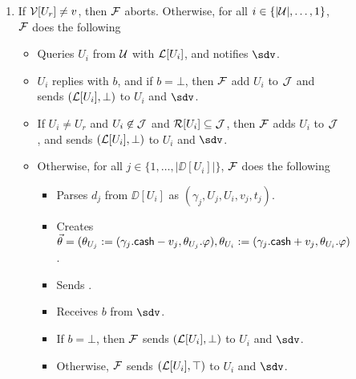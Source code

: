 \begin{figure*}[!t]
{{\begin{enumerate}
	\item If $\mathcal{V}[U_r] \neq v$, then $\mathcal{F}$ aborts. Otherwise, for all $i \in \{|\mathcal{U}|,\ldots,1\}$, 
	$\mathcal{F}$ does the following
	\begin{itemize}[label=-]
		\item Queries $U_i$ from $\mathcal{U}$ with $\mathcal{L}[U_i]$, and notifies $\sdv$.
		\item $U_i$ replies with $b$, and if $b = \bot$, then $\mathcal{F}$ add $U_i$ to $\mathcal{J}$ and sends
		$(\mathcal{L}[U_i],\bot)$ to $U_i$ and $\sdv$. 
		\item If $U_i \neq U_r$ and $U_i \not\in \mathcal{J}$ and $\mathcal{R}[U_i] \subseteq \mathcal{J}$, then $\mathcal{F}$ adds $U_i$ to $\mathcal{J}$, 
		and sends $(\mathcal{L}[U_i],\bot)$ to $U_i$ and $\sdv$.
		\item Otherwise, for all $j \in \{1,\ldots,|\DD[U_i]|\}$, $\mathcal{F}$ does the following
		\begin{itemize}[label=$\circ$]
			\item Parses $d_j$ from $\DD[U_i]$ as $(\gamma_j,U_j,U_i,v_j,t_j)$.
			\item Creates $\vec{\theta} = (\theta_{U_j} := (\gamma_j.\mathsf{cash} - v_j, \theta_{U_j}.
			\varphi), \theta_{U_i} := (\gamma_j.\mathsf{cash} + v_j, \theta_{U_i}.\varphi)$. 
			\item Sends .
			\item Receives $b$ from $\sdv$.
			\item If $b = \bot$, then $\mathcal{F}$ sends $(\mathcal{L}[U_i], \bot)$ to $U_i$ and $\sdv$.
			\item Otherwise, $\mathcal{F}$ sends $(\mathcal{L}[U_i], \top)$ to $U_i$ and $\sdv$.
		\end{itemize}
	\end{itemize}
	

\end{enumerate}}}
\end{figure*}
